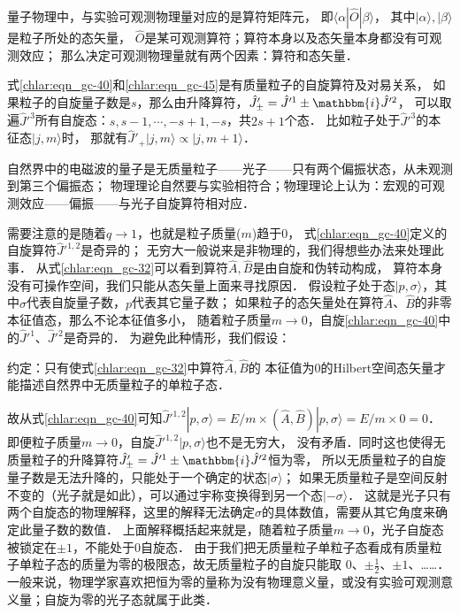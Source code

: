 量子物理中，与实验可观测物理量对应的是算符矩阵元，
即$\langle \alpha | \hat{O}|\beta\rangle$，
其中$|\alpha\rangle,|\beta\rangle$是粒子所处的态矢量，
$\hat{O}$是某可观测算符；算符本身以及态矢量本身都没有可观测效应；
那么决定可观测物理量就有两个因素：{\kaishu 算符和态矢量}．


式\eqref{chlar:eqn_gc-40}和\eqref{chlar:eqn_gc-45}是有质量粒子的自旋算符及对易关系，
如果粒子的自旋量子数是$s$，那么由升降算符，$\hat{J}' _{\pm}=\hat{J}'^1 \pm \mathbbm{i}\hat{J}'^2$，
可以取遍$\hat{J}'^3$所有自旋态：$s,s-1,\cdots,-s+1,-s$，共$2s+1$个态．
比如粒子处于$\hat{J}'^3$的本征态$|j,m\rangle$时，
那就有$\hat{J}'_+|j,m\rangle \propto |j,m+1\rangle$．

自然界中的电磁波的量子是无质量粒子——光子——只有两个偏振状态，从未观测到第三个偏振态；
物理理论自然要与实验相符合；物理理论上认为：宏观的可观测效应——偏振——与光子自旋算符相对应．



需要注意的是随着$q\to 1$，也就是粒子质量($m$)趋于0，
式\eqref{chlar:eqn_gc-40}定义的自旋算符$\hat{J}'^{1,2}$是奇异的；
无穷大一般说来是非物理的，我们得想些办法来处理此事．
从式\eqref{chlar:eqn_gc-32}可以看到算符$\hat{A},\hat{B}$是由自旋和伪转动构成，
算符本身没有可操作空间，我们只能从态矢量上面来寻找原因．
假设粒子处于态$|p,\sigma\rangle$，其中$\sigma$代表自旋量子数，$p$代表其它量子数；
如果粒子的态矢量处在算符$\hat{A}$、$\hat{B}$的非零本征值态，那么不论本征值多小，
随着粒子质量$m\to 0$，自旋\eqref{chlar:eqn_gc-40}中的$\hat{J}'^{1}$、$\hat{J}'^{2}$是奇异的．
为避免此种情形，我们假设：

{{\heiti 约定：}\kaishu 只有使式\eqref{chlar:eqn_gc-32}中算符$\hat{A},\hat{B}$的
	本征值为$0$的Hilbert空间态矢量才能描述自然界中无质量粒子的单粒子态．}

故从式\eqref{chlar:eqn_gc-40}可知$\hat{J}'^{1,2}|p,\sigma\rangle
= E/m \times (\hat{A},\hat{B})|p,\sigma\rangle =E/m \times 0=0$．
即便粒子质量$m\to 0$，自旋$\hat{J}'^{1,2}|p,\sigma\rangle$也不是无穷大，
没有矛盾．同时这也使得无质量粒子的升降算符$\hat{J}' _{\pm}=\hat{J}'^1 \pm\mathbbm{i}\hat{J}'^2$恒为零，
所以无质量粒子的自旋量子数是无法升降的，只能处于一个确定的状态$|\sigma\rangle$；
如果无质量粒子是空间反射不变的（光子就是如此），可以通过宇称变换得到另一个态$|-\sigma\rangle$．
这就是光子只有两个自旋态的物理解释，这里的解释无法确定$\sigma$的具体数值，需要从其它角度来确定此量子数的数值．
上面解释概括起来就是，随着粒子质量$m\to 0$，光子自旋态被锁定在$\pm 1$，不能处于0自旋态．
由于我们把无质量粒子单粒子态看成有质量粒子单粒子态的质量为零的极限态，故无质量粒子的自旋只能取
$0$、$\pm\frac{1}{2}$、$\pm 1$、……．
一般来说，物理学家喜欢把恒为零的量称为没有物理意义量，或没有实验可观测意义量；自旋为零的光子态就属于此类．

